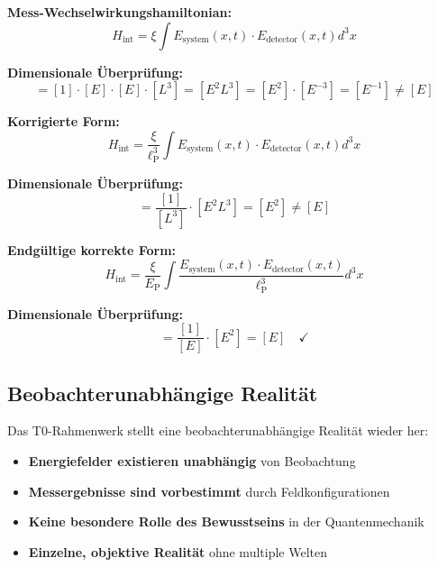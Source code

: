 \documentclass[12pt,a4paper]{report}
\newcommand{\EP}{E_{\text{P}}}            %
\newcommand{\lP}{\ell_{\text{P}}}         %
\begin{document}
	\textbf{Mess-Wechselwirkungshamiltonian:}
	\begin{equation}
		H_{\text{int}} = \xi \int E_{\text{system}}(x,t) \cdot E_{\text{detector}}(x,t) d^3x
	\end{equation}
	
	\textbf{Dimensionale Überprüfung:}
	\begin{equation}
		[H_{\text{int}}] = [1] \cdot [E] \cdot [E] \cdot [L^3] = [E^2 L^3] = [E^2] \cdot [E^{-3}] = [E^{-1}] \neq [E]
	\end{equation}
	
	\textbf{Korrigierte Form:}
	\begin{equation}
		H_{\text{int}} = \frac{\xi}{\lP^3} \int E_{\text{system}}(x,t) \cdot E_{\text{detector}}(x,t) d^3x
	\end{equation}
	
	\textbf{Dimensionale Überprüfung:}
	\begin{equation}
		[H_{\text{int}}] = \frac{[1]}{[L^3]} \cdot [E^2 L^3] = [E^2] \neq [E]
	\end{equation}
	
	\textbf{Endgültige korrekte Form:}
	\begin{equation}
		H_{\text{int}} = \frac{\xi}{\EP} \int \frac{E_{\text{system}}(x,t) \cdot E_{\text{detector}}(x,t)}{\lP^3} d^3x
	\end{equation}
	
	\textbf{Dimensionale Überprüfung:}
	\begin{equation}
		[H_{\text{int}}] = \frac{[1]}{[E]} \cdot [E^2] = [E] \quad \checkmark
	\end{equation}
	
	\subsection{Beobachterunabhängige Realität}
	\label{subsec:observer_independent}
	
	Das T0-Rahmenwerk stellt eine beobachterunabhängige Realität wieder her:
	
	\begin{itemize}
		\item \textbf{Energiefelder existieren unabhängig} von Beobachtung
		\item \textbf{Messergebnisse sind vorbestimmt} durch Feldkonfigurationen
		\item \textbf{Keine besondere Rolle des Bewusstseins} in der Quantenmechanik
		\item \textbf{Einzelne, objektive Realität} ohne multiple Welten
	\end{itemize}
	
\end{document}

